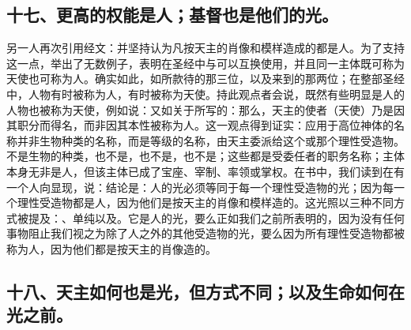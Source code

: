 
\subsection{十七、更高的权能是人；基督也是他们的光。}

另一人再次引用经文：并坚持认为凡按天主的肖像和模样造成的都是人。为了支持这一点，举出了无数例子，表明在圣经中与可以互换使用，并且同一主体既可称为天使也可称为人。确实如此，如所款待的那三位，以及来到的那两位；在整部圣经中，人物有时被称为人，有时被称为天使。持此观点者会说，既然有些明显是人的人物也被称为天使，例如说：又如关于所写的：那么，天主的使者（天使）乃是因其职分而得名，而非因其本性被称为人。这一观点得到证实：应用于高位神体的名称并非生物种类的名称，而是等级的名称，由天主委派给这个或那个理性受造物。不是生物的种类，也不是，也不是，也不是；这些都是受委任者的职务名称；主体本身无非是人，但该主体已成了宝座、宰制、率领或掌权。在书中，我们读到在有一个人向显现，说：结论是：人的光必须等同于每一个理性受造物的光；因为每一个理性受造物都是人，因为他们是按天主的肖像和模样造的。这光照以三种不同方式被提及：、单纯以及。它是人的光，要么正如我们之前所表明的，因为没有任何事物阻止我们视之为除了人之外的其他受造物的光，要么因为所有理性受造物都被称为人，因为他们都是按天主的肖像造的。\par


\subsection{十八、天主如何也是光，但方式不同；以及生命如何在光之前。}

